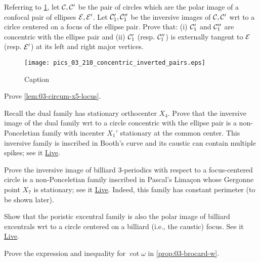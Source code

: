 \begin{exercise}
Referring to \cref{fig:03-concentric-inverted}, let $\mathcal{C},\mathcal{C}'$ be the pair of circles which are the polar image of a confocal pair of ellipses $\mathcal{E},\mathcal{E}'$. Let $\mathcal{C}_1', \mathcal{C}_1''$ be the inversive images of $\mathcal{C},\mathcal{C}'$ wrt to a cirlce centered on a focus of the ellipse pair. Prove that: (i) $\mathcal{C}_1'$ and $\mathcal{C}_1''$ are concentric with the ellipse pair and (ii) $\mathcal{C}_1'$ (resp. $\mathcal{C}_1''$) is externally tangent to $\mathcal{E}$ (resp. $\mathcal{E}'$) at its left and right major vertices.
\end{exercise}

\begin{figure}
    \centering
    \texttt{[image: pics\_03\_210\_concentric\_inverted\_pairs.eps]}
    \caption{Caption}
    \label{fig:03-concentric-inverted}
\end{figure}

\begin{exercise}
Prove \cref{lem:03-circum-x5-locus}.
\label{ex:03-circum-x5-locus}
\end{exercise}

\begin{exercise}
Recall the dual family has stationary orthocenter $X_4$. Prove that the inversive image of the dual family wrt to a circle concentric with the ellipse pair is a non-Ponceletian family with incenter $X_1'$ stationary at the common center. This inversive family is inscribed in Booth's curve and its caustic can contain multiple spikes; see it \href{https://bit.ly/3vCCe05}{Live}.
\end{exercise}

\begin{exercise}
Prove the inversive image of billiard 3-periodics with respect to a focus-centered circle is a non-Ponceletian family inscribed in Pascal's Limaçon whose Gergonne point $X_7$ is stationary; see it \href{https://bit.ly/3edwKD7}{Live}. Indeed, this family has constant perimeter (to be shown later).
\end{exercise}

\begin{exercise}
Show that the poristic excentral family is also the polar image of billiard excentrals wrt to a circle centered on a billiard (i.e., the caustic) focus. See it \href{https://bit.ly/33c1s9A}{Live}.
\end{exercise}

\begin{exercise}
Prove the expression and inequality for $\cot{\omega}$ in \cref{prop:03-brocard-w}.
\end{exercise}